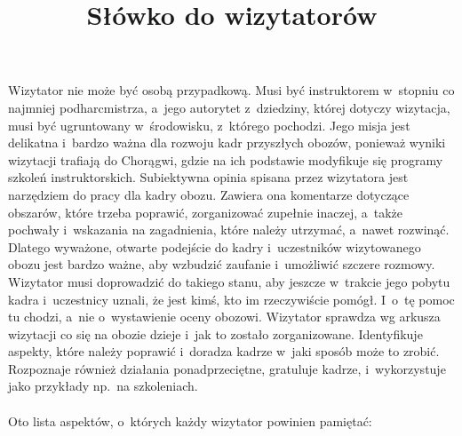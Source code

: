 \documentclass[a4paper,10pt,notitlepage,twoside]{article}
\title{Słówko do wizytatorów}
\date{} %
\begin{document}
\renewcommand{\headwidth}{18cm} %


\maketitle
\thispagestyle{fancy} %

Wizytator nie może być osobą przypadkową. Musi być instruktorem w~stopniu co najmniej podharcmistrza, a~jego autorytet z~dziedziny, której dotyczy wizytacja, musi być ugruntowany w~środowisku, z~którego pochodzi. Jego misja jest delikatna i~bardzo ważna dla rozwoju kadr przyszłych obozów, ponieważ wyniki wizytacji trafiają do Chorągwi, gdzie na ich podstawie modyfikuje się programy szkoleń instruktorskich. Subiektywna opinia spisana przez wizytatora jest narzędziem do pracy dla kadry obozu. Zawiera ona komentarze dotyczące obszarów, które trzeba poprawić, zorganizować zupełnie inaczej, a~także pochwały i~wskazania na zagadnienia, które należy utrzymać, a~nawet rozwinąć. Dlatego wyważone, otwarte podejście do kadry i~uczestników wizytowanego obozu jest bardzo ważne, aby wzbudzić zaufanie i~umożliwić szczere rozmowy. Wizytator musi doprowadzić do takiego stanu, aby jeszcze w~trakcie jego pobytu kadra i~uczestnicy uznali, że jest kimś, kto im rzeczywiście pomógł. I~o~tę pomoc tu chodzi, a~nie o~wystawienie oceny obozowi. Wizytator sprawdza wg arkusza wizytacji co się na obozie dzieje i~jak to zostało zorganizowane. Identyfikuje aspekty, które należy poprawić i~doradza kadrze w~jaki sposób może to zrobić. Rozpoznaje również działania ponadprzeciętne, gratuluje kadrze, i~wykorzystuje jako przykłady np.~na szkoleniach.\\
\\
Oto lista aspektów, o~których każdy wizytator powinien pamiętać:
\end{document}
